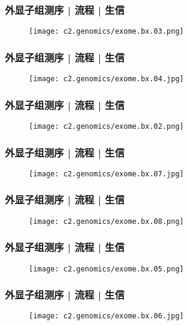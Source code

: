 \begin{frame}
  \frametitle{外显子组测序 | 流程 | 生信}
  \begin{figure}
    \centering
    \texttt{[image: c2.genomics/exome.bx.03.png]}
  \end{figure}
\end{frame}

\begin{frame}
  \frametitle{外显子组测序 | 流程 | 生信}
  \begin{figure}
    \centering
    \texttt{[image: c2.genomics/exome.bx.04.jpg]}
  \end{figure}
\end{frame}

\begin{frame}
  \frametitle{外显子组测序 | 流程 | 生信}
  \begin{figure}
    \centering
    \texttt{[image: c2.genomics/exome.bx.02.png]}
  \end{figure}
\end{frame}

\begin{frame}
  \frametitle{外显子组测序 | 流程 | 生信}
  \begin{figure}
    \centering
    \texttt{[image: c2.genomics/exome.bx.07.jpg]}
  \end{figure}
\end{frame}

\begin{frame}
  \frametitle{外显子组测序 | 流程 | 生信}
  \begin{figure}
    \centering
    \texttt{[image: c2.genomics/exome.bx.08.png]}
  \end{figure}
\end{frame}

\begin{frame}
  \frametitle{外显子组测序 | 流程 | 生信}
  \begin{figure}
    \centering
    \texttt{[image: c2.genomics/exome.bx.05.png]}
  \end{figure}
\end{frame}

\begin{frame}
  \frametitle{外显子组测序 | 流程 | 生信}
  \begin{figure}
    \centering
    \texttt{[image: c2.genomics/exome.bx.06.jpg]}
  \end{figure}
\end{frame}

